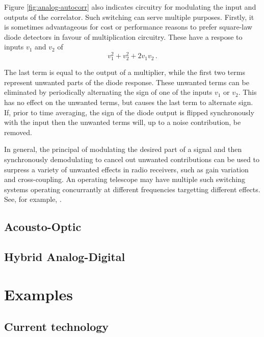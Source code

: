 \documentclass{ws-rv961x669}
\begin{document}
Figure \ref{fig:analog-autocorr} also indicates circuitry for modulating the input and outputs of the correlator. Such switching can serve multiple purposes. Firstly, it is sometimes advantageous for cost or performance reasons to prefer square-law diode detectors in favour of multiplication circuitry. These have a respose to inputs $v_1$ and $v_2$ of
\begin{equation}
 v_1^2 + v_2^2 + 2v_1v_2 \, .
\end{equation}

The last term is equal to the output of a multiplier, while the first two terms represent unwanted parts of the diode response. These unwanted terms can be eliminated by periodically alternating the sign of one of the inputs $v_1$ or $v_2$. This has no effect on the unwanted terms, but causes the last term to alternate sign. If, prior to time averaging, the sign of the diode output is flipped synchronously with the input then the unwanted terms will, up to a noise contribution, be removed.

In general, the principal of modulating the desired part of a signal and then synchronously demodulating to cancel out unwanted contributions can be used to surpress a variety of unwanted effects in radio receivers, such as gain variation and cross-coupling. An operating telescope may have multiple such switching systems operating concurrantly at different frequencies targetting different effects. See, for example, \cite{Erickson2007}. 

\subsection{Acousto-Optic}\label{acousto-optic}

\subsection{Hybrid Analog-Digital}\label{hybrid-analog-digital}






\section{Examples}


\subsection{Current technology}
\end{document}

